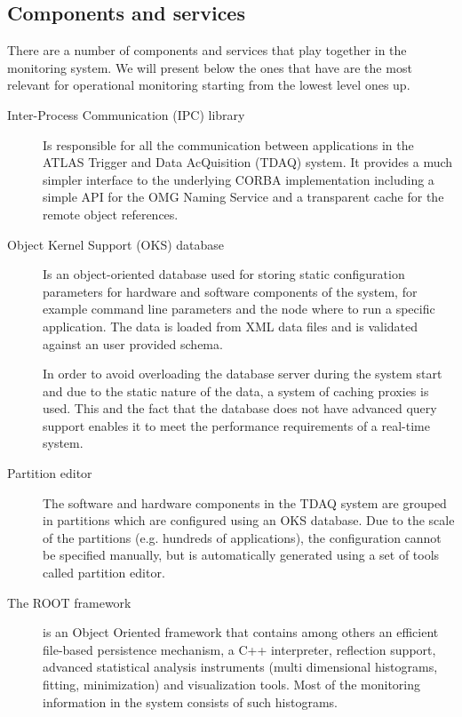 \subsection*{Components and services}

There are a number of components and services that play together in the monitoring system. We will present below the ones that have are the most relevant for operational monitoring starting from the lowest level ones up.

\begin{description}
\item[Inter-Process Communication (IPC) library \citep{corso2007data}] Is responsible for all the communication between applications in the ATLAS Trigger and Data AcQuisition (TDAQ)  system. It provides a much simpler interface to the underlying CORBA implementation including a simple API for the OMG Naming Service and a transparent cache for the remote object references.

\item[Object Kernel Support (OKS) database \citep{jones1998oks}\citep{alexandrov2001atlas}] Is an object-oriented database used for storing static configuration parameters for hardware and software components of the system, for example command line parameters and the node where to run a specific application. The data is loaded from XML data files and is validated against an user provided schema. 

In order to avoid overloading the database server during the system start and due to the static nature of the data, a system of caching proxies is used. This and the fact that the database does not have advanced query support enables it to meet the performance requirements of a real-time system.

\item[Partition editor] The software and hardware components in the TDAQ system are grouped in partitions which are configured using an OKS database. Due to the scale of the partitions (e.g. hundreds of applications), the configuration cannot be specified manually, but is automatically generated using a set of tools called partition editor.

\item[The ROOT framework \citep{brun1997root}] is an Object Oriented framework that contains among others an efficient file-based persistence mechanism, a C++ interpreter, reflection support, advanced statistical analysis instruments (multi dimensional histograms, fitting, minimization) and visualization tools. Most of the monitoring information in the system consists of such histograms.


\end{description}

